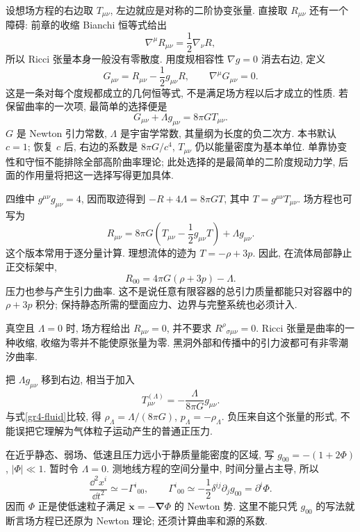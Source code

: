 
设想场方程的右边取 $T_{\mu\nu}$, 左边就应是对称的二阶协变张量. 直接取 $R_{\mu\nu}$ 还有一个障碍: 前章的收缩 Bianchi 恒等式给出
\[
 \nabla^\mu R_{\mu\nu}=\frac12\nabla_\nu R,
\]
所以 Ricci 张量本身一般没有零散度. 用度规相容性 $\nabla g=0$ 消去右边, 定义
\begin{equation}\label{gr4-einstein-tensor}
 G_{\mu\nu}=R_{\mu\nu}-\frac12g_{\mu\nu}R,
 \qquad \nabla^\mu G_{\mu\nu}=0.
\end{equation}
这是一条对每个度规都成立的几何恒等式, 不是满足场方程以后才成立的性质. 若保留曲率的一次项, 最简单的选择便是
\begin{equation}\label{gr4-efe}
 G_{\mu\nu}+\Lambda g_{\mu\nu}=8\pi G T_{\mu\nu}.
\end{equation}
$G$ 是 Newton 引力常数, $\Lambda$ 是宇宙学常数, 其量纲为长度的负二次方. 本书默认 $c=1$; 恢复 $c$ 后, 右边的系数是 $8\pi G/c^4$, $T_{\mu\nu}$ 仍以能量密度为基本单位. 单靠协变性和守恒不能排除全部高阶曲率理论; 此处选择的是最简单的二阶度规动力学, 后面的作用量将把这一选择写得更加具体.

四维中 $g^{\mu\nu}g_{\mu\nu}=4$, 因而取迹得到 $-R+4\Lambda=8\pi G T$, 其中 $T=g^{\mu\nu}T_{\mu\nu}$. 场方程也可写为
\begin{equation}\label{gr4-trace-reversed}
 R_{\mu\nu}=8\pi G\left(T_{\mu\nu}-\frac12g_{\mu\nu}T\right)
               +\Lambda g_{\mu\nu}.
\end{equation}
这个版本常用于逐分量计算. 理想流体的迹为 $T=-\rho+3p$. 因此, 在流体局部静止正交标架中,
\[
 R_{00}=4\pi G(\rho+3p)-\Lambda.
\]
压力也参与产生引力曲率. 这不是说任意有限容器的总引力质量都能只对容器中的 $\rho+3p$ 积分; 保持静态所需的壁面应力、边界与完整系统也必须计入.

\begin{remark}
真空且 $\Lambda=0$ 时, 场方程给出 $R_{\mu\nu}=0$, 并不要求 $R^\rho{}_{\sigma\mu\nu}=0$. Ricci 张量是曲率的一种收缩, 收缩为零并不能使原张量为零. 黑洞外部和传播中的引力波都可有非零潮汐曲率.
\end{remark}

把 $\Lambda g_{\mu\nu}$ 移到右边, 相当于加入
\[
 T^{(\Lambda)}_{\mu\nu}=-\frac{\Lambda}{8\pi G}g_{\mu\nu}.
\]
与式\eqref{gr4-fluid}比较, 得 $\rho_\Lambda=\Lambda/(8\pi G)$, $p_\Lambda=-\rho_\Lambda$. 负压来自这个张量的形式, 不能误把它理解为气体粒子运动产生的普通正压力.


在近乎静态、弱场、低速且压力远小于静质量能密度的区域, 写 $g_{00}=-(1+2\Phi)$, $|\Phi|\ll1$. 暂时令 $\Lambda=0$. 测地线方程的空间分量中, 时间分量占主导, 所以
\[
 \frac{\dd^2 x^i}{\dd t^2}\simeq-\Gamma^i{}_{00},\qquad
 \Gamma^i{}_{00}\simeq-\frac12\delta^{ij}\partial_j g_{00}
  =\partial^i\Phi.
\]
因而 $\Phi$ 正是使低速粒子满足 $\ddot{\boldsymbol x}=-\boldsymbol\nabla\Phi$ 的 Newton 势. 这里不能只凭 $g_{00}$ 的写法就断言场方程已还原为 Newton 理论; 还须计算曲率和源的系数.

